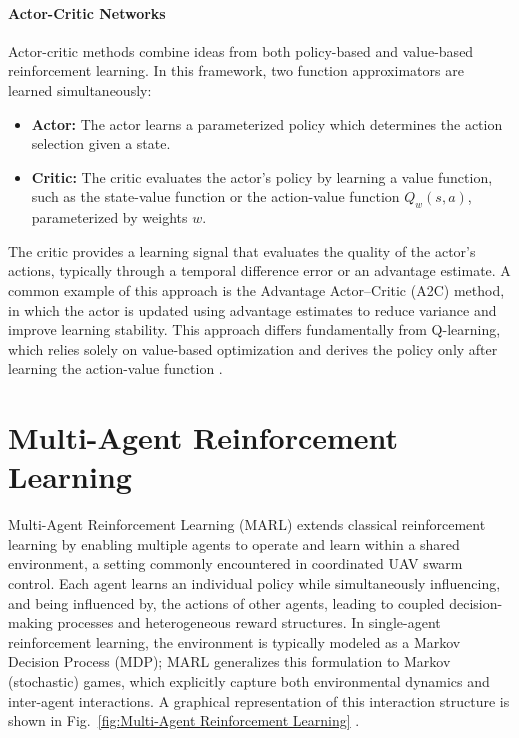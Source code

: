 \paragraph{Actor-Critic Networks}
Actor-critic methods combine ideas from both policy-based and value-based reinforcement learning. In this framework, two function approximators are learned simultaneously:

\begin{itemize}
    \item \textbf{Actor:} The actor learns a parameterized policy which determines the action selection given a state.
    \item \textbf{Critic:} The critic evaluates the actor’s policy by learning a value function, such as the state-value function or the action-value function \( Q_w(s,a) \), parameterized by weights \( w \).
\end{itemize}

The critic provides a learning signal that evaluates the quality of the actor’s actions, typically through a temporal difference error or an advantage estimate. A common example of this approach is the Advantage Actor--Critic (A2C) method, in which the actor is updated using advantage estimates to reduce variance and improve learning stability. This approach differs fundamentally from Q-learning, which relies solely on value-based optimization and derives the policy only after learning the action-value function \cite{brunton2022data}.





\section{Multi-Agent Reinforcement Learning}

Multi-Agent Reinforcement Learning (MARL) extends classical reinforcement learning by enabling multiple agents to operate and learn within a shared environment, a setting commonly encountered in coordinated UAV swarm control. Each agent learns an individual policy while simultaneously influencing, and being influenced by, the actions of other agents, leading to coupled decision-making processes and heterogeneous reward structures. In single-agent reinforcement learning, the environment is typically modeled as a Markov Decision Process (MDP); MARL generalizes this formulation to Markov (stochastic) games, which explicitly capture both environmental dynamics and inter-agent interactions. A graphical representation of this interaction structure is shown in Fig.~\ref{fig:Multi-Agent Reinforcement Learning} \cite{ekecki2025uavcontrolsurvey}.

